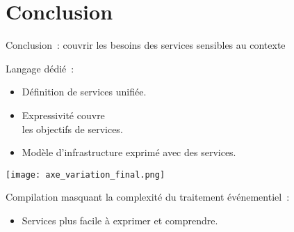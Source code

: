 \section*{Conclusion}
\begin{frame}{Conclusion~: couvrir les besoins des services sensibles au contexte}
\begin{minipage}{.5\linewidth}
Langage dédié~:
\begin{itemize}
\item Définition de services unifiée.
\item Expressivité couvre \\les objectifs de services.
\item Modèle d'infrastructure exprimé avec des services.
\end{itemize}
\end{minipage}
\hfill
\begin{minipage}{.45\linewidth}
    \texttt{[image: axe\_variation\_final.png]}
\end{minipage}
\vfill
Compilation masquant la complexité du traitement événementiel~:
\begin{itemize}
\item Services plus facile à exprimer et comprendre.
\end{itemize}



\end{frame}

